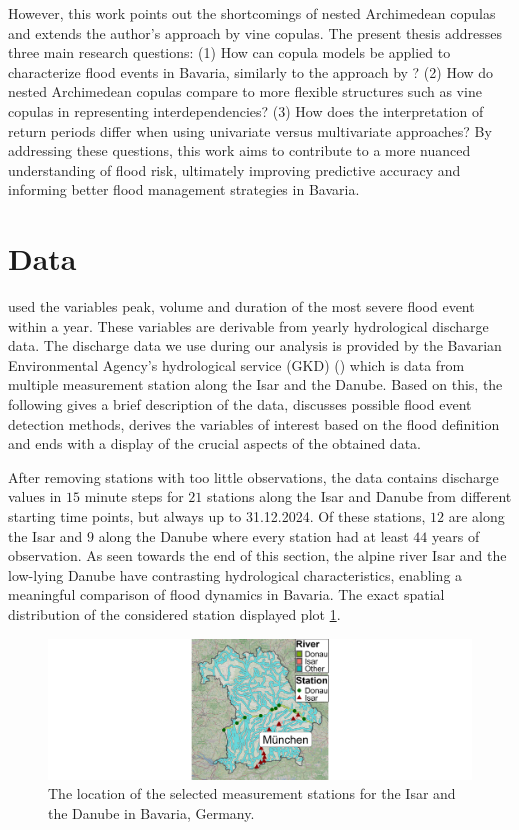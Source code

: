 \documentclass[
]{krantz}
\begin{document}
However, this work points out the shortcomings of nested Archimedean copulas and extends the author's approach
by vine copulas.
The present thesis addresses three main research questions:
(1) How can copula models be applied to characterize flood events in Bavaria, similarly to the approach by \citet{grimaldi2006}?
(2) How do nested Archimedean copulas compare to more flexible structures such as vine copulas in representing interdependencies?
(3) How does the interpretation of return periods differ when using univariate versus multivariate approaches?
By addressing these questions, this work aims to contribute to a more nuanced understanding of flood risk, ultimately improving predictive accuracy and informing better flood management strategies in Bavaria.

\section{Data}\label{data}

\citet{grimaldi2006} used the variables peak, volume and duration
of the most severe flood event within a year.
These variables are derivable from yearly hydrological discharge data.
The discharge data we use during our analysis
is provided by the
Bavarian Environmental Agency's hydrological service (GKD) (\citet{gkd2025}) which
is data from multiple measurement station along the Isar and the Danube.
Based on this, the following
gives a brief description of the data,
discusses possible flood event detection methods,
derives the variables of interest based on the flood definition and
ends with a display of the crucial aspects of the obtained data.

After removing stations with too little observations,
the data contains discharge values in \(15\) minute steps for
\(21\) stations along the Isar and Danube from different starting time points, but always up to 31.12.2024.
Of these stations, \(12\) are along the Isar and \(9\) along the Danube where every station had at least \(44\) years of observation.
As seen towards the end of this section, the alpine river Isar and the low-lying Danube have contrasting
hydrological characteristics, enabling a meaningful comparison of flood dynamics in Bavaria.
The exact spatial distribution of the considered station displayed plot \ref{fig:bavaria}.

\begin{figure}

{\centering \includegraphics[width=1\linewidth]{work/04-floodfreq/figures/data_bavaria_plot} 

}

\caption{The location of the selected measurement stations for the Isar and the Danube in Bavaria, Germany.}\label{fig:bavaria}
\end{figure}
\end{document}
